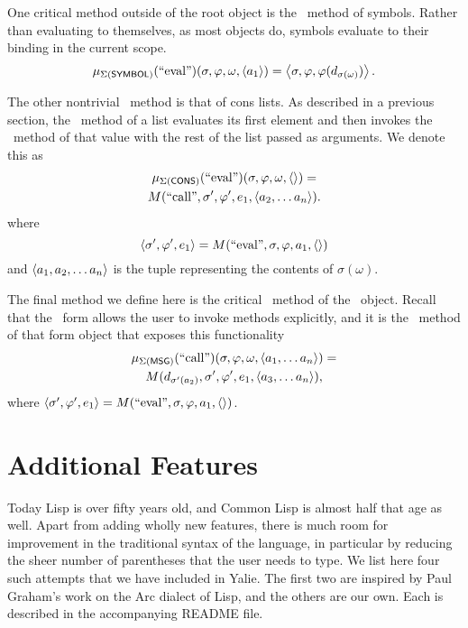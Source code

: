 \documentclass[twocolumn]{article}
\begin{document}
One critical method outside of the root object is the \eval\ method of
symbols. Rather than evaluating to themselves, as most objects do,
symbols evaluate to their binding in the current scope.
\[  \mu_{\Sigma(\mathsf{SYMBOL})}(\text{``eval''})(\sigma,\varphi,\omega,
\left< a_1\right>) = \left< \sigma, \varphi, \varphi(d_{\sigma(\omega)})\right>.\]

The other nontrivial \eval\ method is that of cons lists. As described
in a previous section, the \eval\ method of a list evaluates its first
element and then invokes the \call\ method of that value with the rest
of the list passed as arguments. We denote this as
\begin{multline*}
\mu_{\Sigma(\mathsf{CONS})}(\text{``eval''})(\sigma,\varphi,\omega,
\left<\right>) = \\M(\text{``call''},\sigma',\varphi',e_1,\left< a_2,\ldots
a_n\right>).
\end{multline*}
where 
\[ \left< \sigma',\varphi',e_1\right> =
M(\text{``eval''},\sigma,\varphi,a_1,\left<\right>) \]
and $\left< a_1,a_2,\ldots a_n\right>$ is the tuple representing the
contents of $\sigma(\omega)$.

The final method we define here is the critical \call\ method of the
\msg\ object. Recall that the \msg\ form allows the user to invoke
methods explicitly, and it is the \call\ method of that form object
that exposes this functionality
\begin{multline*}
  \mu_{\Sigma(\mathsf{MSG})}(\text{``call''})(\sigma,\varphi,\omega,
  \left< a_1,\ldots a_n \right>) = \\M( d_{\sigma'(a_2)}, \sigma', \varphi', e_1,
  \left< a_3,\ldots a_n \right>),
\end{multline*}
where $\left< \sigma', \varphi', e_1\right> =
M(\text{``eval''},\sigma,\varphi,a_1,\left<\right>)$.

\section*{Additional Features}
Today Lisp is over fifty years old, and Common Lisp is almost half
that age as well. Apart from adding wholly new features, there is much
room for improvement in the traditional syntax of the language, in
particular by reducing the sheer number of parentheses that the user
needs to type. We list here four such attempts that we have included
in Yalie. The first two are inspired by Paul Graham's work on the Arc
dialect of Lisp\cite{Graham}, and the others are our own. Each is
described in the accompanying README file.
\end{document}

